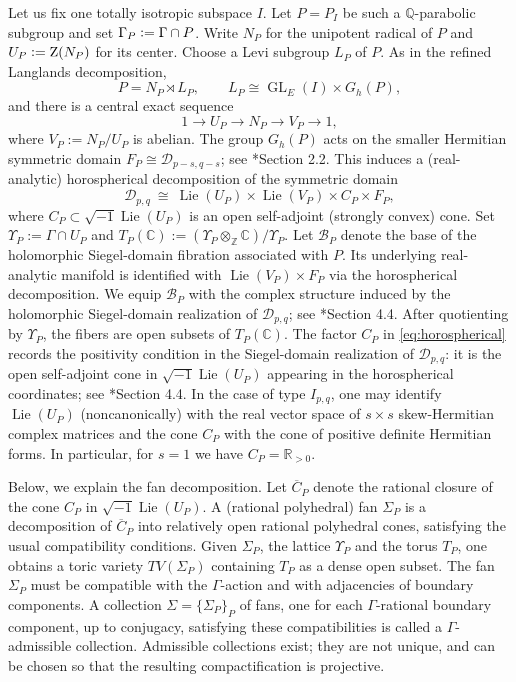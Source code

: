 \documentclass[11pt]{amsart}
\theoremstyle{plain}
\theoremstyle{definition}
\numberwithin{equation}{section}
\def\Lie{\mathop{\mathrm{Lie}}\nolimits}
\def\GL{\mathop{\mathrm{GL}}\nolimits}
\newcommand{\bbC}{\mathbb{C}}
\newcommand{\bbQ}{\mathbb{Q}}
\newcommand{\bbR}{\mathbb{R}}
\newcommand{\bbZ}{\mathbb{Z}}
\newcommand{\defeq}{\vcentcolon=}
\begin{document}
Let us fix one totally isotropic subspace $I$.
Let $P=P_I$ be such a $\bbQ$-parabolic subgroup and set $\Gamma_P\defeq\Gamma\cap P$.
Write $N_P$ for the unipotent radical of $P$ and $U_P\defeq \mathrm{Z}(N_P)$ for its center.
Choose a Levi subgroup $L_P$ of $P$. As in the refined Langlands decomposition,
\[
 P=N_P\rtimes L_P,
 \qquad L_P\cong\GL_E(I)\times G_h(P),
\]
and there is a central exact sequence
\[
 1\longrightarrow U_P\longrightarrow N_P
 \longrightarrow V_P\longrightarrow1,
\]
where $V_P:=N_P/U_P$ is abelian. 
The group $G_h(P)$ acts on the smaller Hermitian symmetric
domain $F_P\cong\mathcal D_{p-s,q-s}$; see  \cite{kasparian2021toroidal}*{Section 2.2}.
This induces a (real-analytic) horospherical decomposition of the symmetric domain
\begin{equation}\label{eq:horospherical}
  \mathcal{D}_{p,q}\ \cong\ \Lie(U_P)\times \Lie(V_P)\times C_P\times F_P,
\end{equation}
where $C_P\subset \sqrt{-1}\Lie(U_P)$ is an open self-adjoint (strongly convex) cone.
Set $\Upsilon_P:=\Gamma\cap U_P$ and
$T_P(\bbC):=(\Upsilon_P\otimes_{\bbZ}\bbC)/\Upsilon_P$.
Let $\mathcal B_P$ denote the base of the holomorphic
Siegel-domain fibration associated with $P$.
Its underlying real-analytic manifold is identified with
$\Lie(V_P)\times F_P$ via the horospherical decomposition.
We equip $\mathcal B_P$ with the complex structure induced
by the holomorphic Siegel-domain realization of
$\mathcal D_{p,q}$;
see \cite{kasparian2021toroidal}*{Section 4.4}.
After quotienting by $\Upsilon_P$, the fibers are open
subsets of $T_P(\bbC)$.
The factor $C_P$ in \eqref{eq:horospherical} records the positivity
condition in the Siegel-domain realization of $\mathcal{D}_{p,q}$:
it is the open self-adjoint cone in
$\sqrt{-1}\Lie(U_P)$ appearing in the horospherical coordinates;
see \cite{kasparian2021toroidal}*{Section 4.4}.
In the case of type $I_{p,q}$, one may identify $\Lie(U_P)$ (noncanonically) with the real vector space
of $s\times s$ skew-Hermitian complex matrices  and the cone $C_P$
with the cone of positive definite Hermitian forms. 
In particular, for $s=1$ we have $C_P=\bbR_{>0}$.

Below, we explain the fan decomposition.
Let $\overline{C}_P$ denote the rational closure of the cone $C_P$ in $\sqrt{-1}\Lie(U_P)$.
A (rational polyhedral) fan $\Sigma_P$ is a decomposition of $\overline{C}_P$ into relatively open
rational polyhedral cones, satisfying the usual compatibility conditions.
Given $\Sigma_P$, the lattice $\Upsilon_P$ and the torus $T_P$, one obtains a toric variety $TV(\Sigma_P)$ containing $T_P$ as a dense open subset.
The fan $\Sigma_P$ must be compatible with the $\Gamma$-action and with adjacencies of boundary components.
A collection $\Sigma=\{\Sigma_P\}_P$ of fans, one for each $\Gamma$-rational boundary component, up to conjugacy,
satisfying these compatibilities is called a $\Gamma$-admissible collection.
Admissible collections exist; they are not unique, and can be chosen so that the resulting compactification is
projective.
\end{document}
